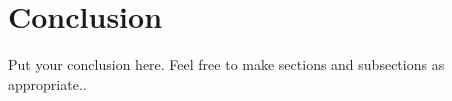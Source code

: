 \chapter{Conclusion} \label{chp:chapter4}

Put your conclusion here. Feel free to make sections and subsections as appropriate..
